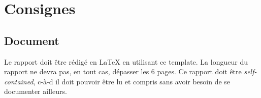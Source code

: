 \documentclass[journal, a4paper]{IEEEtran}
\begin{document}



\newpage
		
\appendices
\section{Consignes}
\subsection*{Document}
	Le rapport doit être rédigé en \LaTeX{} en utilisant ce template.
	La longueur du rapport ne devra pas, en tout cas, dépasser les 6 pages.
	Ce rapport doit être \emph{self-contained}, c-à-d il doit pouvoir être lu et compris sans avoir besoin de se documenter ailleurs.



\end{document}
